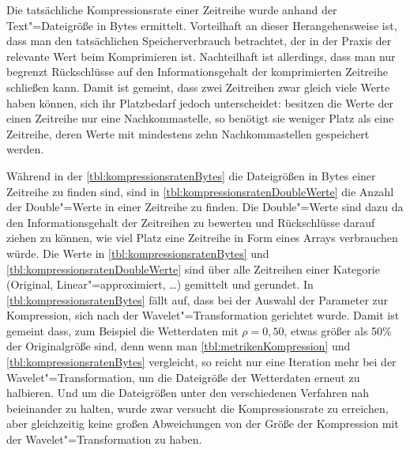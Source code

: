 Die tatsächliche Kompressionsrate einer Zeitreihe wurde anhand der Text"=Dateigröße in Bytes ermittelt. Vorteilhaft an dieser Herangehensweise ist, dass man den tatsächlichen Speicherverbrauch betrachtet, der in der Praxis der relevante Wert beim Komprimieren ist. Nachteilhaft ist allerdings, dass man nur begrenzt Rückschlüsse auf den Informationsgehalt der komprimierten Zeitreihe schließen kann. Damit ist gemeint, dass zwei Zeitreihen zwar gleich viele Werte haben können, sich ihr Platzbedarf jedoch unterscheidet: besitzen die Werte der einen Zeitreihe nur eine Nachkommastelle, so benötigt sie weniger Platz als eine Zeitreihe, deren Werte mit mindestens zehn Nachkommastellen gespeichert werden. 

Während in der \autoref{tbl:kompressionsratenBytes} die Dateigrößen in Bytes einer Zeitreihe zu finden sind, sind in \autoref{tbl:kompressionsratenDoubleWerte} die Anzahl der Double"=Werte in einer Zeitreihe zu finden. Die Double"=Werte sind dazu da den Informationsgehalt der Zeitreihen zu bewerten und Rückschlüsse darauf ziehen zu können, wie viel Platz eine Zeitreihe in Form eines Arrays verbrauchen würde. Die Werte in \autoref{tbl:kompressionsratenBytes} und \autoref{tbl:kompressionsratenDoubleWerte} sind über alle Zeitreihen einer Kategorie (Original, Linear"=approximiert, \dots) gemittelt und gerundet. In \autoref{tbl:kompressionsratenBytes} fällt auf, dass bei der Auswahl der Parameter zur Kompression, sich nach der Wavelet"=Transformation gerichtet wurde. Damit ist gemeint dass, zum Beispiel die Wetterdaten mit $\rho=0,50$, etwas größer als 50\% der Originalgröße sind, denn wenn man \autoref{tbl:metrikenKompression} und \autoref{tbl:kompressionsratenBytes} vergleicht, so reicht nur eine Iteration mehr bei der Wavelet"=Transformation, um die Dateigröße der Wetterdaten erneut zu halbieren. Und um die Dateigrößen unter den verschiedenen Verfahren nah beieinander zu halten, wurde zwar versucht die Kompressionsrate zu erreichen, aber gleichzeitig keine großen Abweichungen von der Größe der Kompression mit der Wavelet"=Transformation zu haben. 

